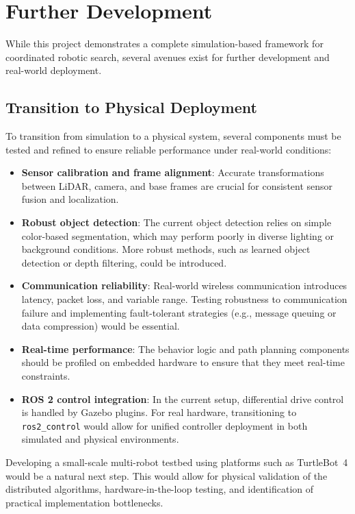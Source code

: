 \section{Further Development}

While this project demonstrates a complete simulation-based framework for coordinated robotic search, several avenues exist for further development and real-world deployment.

\subsection{Transition to Physical Deployment}
To transition from simulation to a physical system, several components must be tested and refined to ensure reliable performance under real-world conditions:
\begin{itemize}
  \item \textbf{Sensor calibration and frame alignment}: Accurate transformations between LiDAR, camera, and base frames are crucial for consistent sensor fusion and localization.
  \item \textbf{Robust object detection}: The current object detection relies on simple color-based segmentation, which may perform poorly in diverse lighting or background conditions. More robust methods, such as learned object detection or depth filtering, could be introduced.
  \item \textbf{Communication reliability}: Real-world wireless communication introduces latency, packet loss, and variable range. Testing robustness to communication failure and implementing fault-tolerant strategies (e.g., message queuing or data compression) would be essential.
  \item \textbf{Real-time performance}: The behavior logic and path planning components should be profiled on embedded hardware to ensure that they meet real-time constraints.
  \item \textbf{ROS 2 control integration}: In the current setup, differential drive control is handled by Gazebo plugins. For real hardware, transitioning to \texttt{ros2\_control} would allow for unified controller deployment in both simulated and physical environments.
\end{itemize}

Developing a small-scale multi-robot testbed using platforms such as TurtleBot~4 would be a natural next step. This would allow for physical validation of the distributed algorithms, hardware-in-the-loop testing, and identification of practical implementation bottlenecks.

